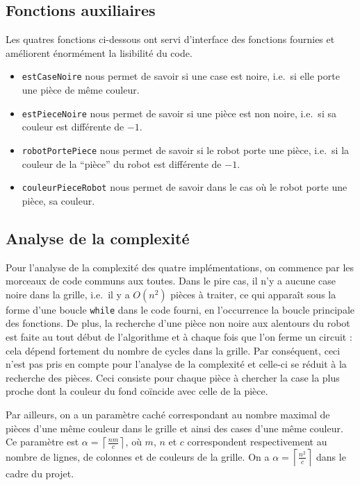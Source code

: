 \documentclass[12pt,a4paper]{article}
\begin{document}
\subsection*{Fonctions auxiliaires}
Les quatres fonctions ci-dessous ont servi d'interface des fonctions fournies 
et am\'eliorent \'enorm\'ement la lisibilit\'e du code. 
\begin{itemize}
  \item \texttt{estCaseNoire} nous permet de savoir si une case est 
  noire, i.e.\ si elle porte une pi\`ece de m\^eme couleur.
  \item \texttt{estPieceNoire} nous permet de savoir si une pi\`ece 
  est non noire, i.e.\ si sa couleur est diff\'erente de $-1$.
  \item \texttt{robotPortePiece} nous permet de savoir si le robot 
  porte une pi\`ece, i.e.\ si la couleur de la ``pi\`ece'' du robot est 
  diff\'erente de $-1$.
  \item \texttt{couleurPieceRobot} nous permet de savoir dans le 
cas o\`u le robot porte une pi\`ece, sa couleur.
\end{itemize}

\subsection*{Analyse de la complexit\'e}
Pour l'analyse de la complexit\'e des quatre impl\'ementations, on 
commence par les morceaux de code communs aux toutes. Dans le pire cas, 
il n'y a aucune case noire dans la grille, i.e.\ il y a $O(n^2)$ pi\`eces \`a 
traiter, ce qui appara\^it sous la forme d'une boucle \texttt{while} dans le 
code fourni, en l'occurrence la boucle principale des fonctions. De 
plus, la recherche d'une pi\`ece non noire aux alentours du robot est faite au 
tout d\'ebut de l'algorithme et \`a chaque fois que l'on ferme un 
circuit : cela d\'epend fortement du nombre de cycles dans la grille. Par 
cons\'equent, ceci n'est pas pris en compte pour l'analyse de la complexit\'e 
et celle-ci se r\'eduit \`a la recherche des pi\`eces. Ceci consiste pour chaque 
pi\`ece \`a chercher la case la plus proche dont la couleur du fond co\"incide 
avec celle de la pi\`ece. 

Par ailleurs, on a un param\`etre cach\'e correspondant au nombre maximal de 
pi\`eces d'une m\^eme couleur dans le grille et ainsi des cases d'une m\^eme 
couleur. Ce param\`etre est $\alpha = \left \lceil \frac{nm}{c} \right \rceil$, 
o\`u $m$, $n$ et $c$ correspondent respectivement au nombre de lignes, de 
colonnes et de couleurs de la grille. On a $\alpha = \left \lceil \frac{n^2}{c} 
\right \rceil$ dans le cadre du projet.
\end{document}
